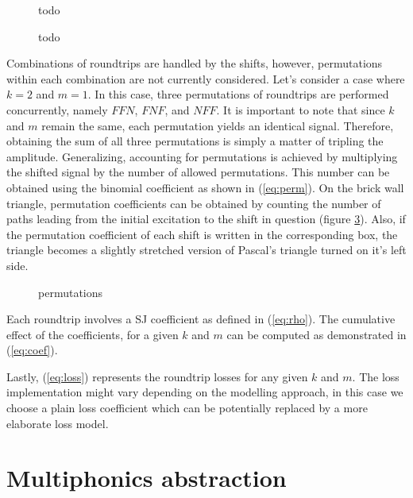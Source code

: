 \documentclass{sigchi}
\begin{document}
\begin{figure}[h]
	\centering
	\scalebox{0.75}{}
	\caption{
		todo
	}
	\label{fig:shifts}
\end{figure}

\begin{figure}[h]
	\centering
	\caption{
		todo
	}
	\label{fig:triangle}
\end{figure}

Combinations of roundtrips are handled by the shifts, however, permutations within each combination are not currently considered.
Let's consider a case where $k = 2$ and $m = 1$.
In this case, three permutations of roundtrips are performed concurrently, namely $FFN$, $FNF$, and $NFF$.
It is important to note that since $k$ and $m$ remain the same, each permutation yields an identical signal.
Therefore, obtaining the sum of all three permutations is simply a matter of tripling the amplitude.
Generalizing, accounting for permutations is achieved by multiplying the shifted signal by the number of allowed permutations.
This number can be obtained using the binomial coefficient as shown in (\ref{eq:perm}). On the brick wall triangle, permutation coefficients can be obtained by counting the number of paths leading from the initial excitation to the shift in question (figure \ref{fig:permutations}). Also, if the permutation coefficient of each shift is written in the corresponding box, the triangle becomes a slightly stretched version of Pascal's triangle turned on it's left side.

\begin{figure}[h]
	\centering
	\caption{
		permutations
	}
	\label{fig:permutations}
\end{figure}

Each roundtrip involves a SJ coefficient as defined in (\ref{eq:rho}).
The cumulative effect of the coefficients, for a given $k$ and $m$ can be computed as demonstrated in (\ref{eq:coef}).

Lastly, (\ref{eq:loss}) represents the roundtrip losses for any given $k$ and $m$.
The loss implementation might vary depending on the modelling approach, in this case we choose a plain loss coefficient which can be potentially replaced by a more elaborate loss model.

\section{Multiphonics abstraction}
\end{document}
